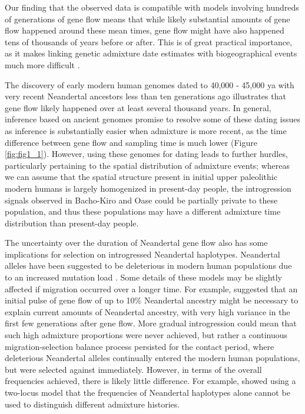 \documentclass[11pt]{article}
\begin{document}
Our finding that the observed data is compatible with models involving hundreds of generations of gene flow means that while likely substantial amounts of gene flow happened around these mean times, gene flow might have also happened tens of thousands of years before or after. This is of great practical importance, as it makes linking genetic admixture date estimates with biogeographical events much more difficult \citep{sankararaman_date_2012,lazaridis_genomic_2016,douka_age_2019,jacobs_multiple_2019,vyas_analyses_2019}. 

The discovery of early modern human genomes dated to 40,000 - 45,000 ya with very recent Neandertal ancestors less than ten generations ago \citep{fu_genome_2014, hajdinjak_initial_2021} illustrates that gene flow likely happened over at least several thousand years.  In general, inference based on ancient genomes \citep{fu_genome_2014, fu_early_2015, moorjani_genetic_2016, hajdinjak_initial_2021} promise to resolve some of these dating issues as inference is substantially easier when admixture is more recent, as the time difference between gene flow and sampling time is much lower (Figure \ref{fig:fig1_1}). However, using these genomes for dating leads to further hurdles, particularly pertaining to the spatial distribution of admixture events; whereas we can assume that the spatial structure present in initial upper paleolithic modern humans is largely homogenized in present-day people, the introgression signals observed in Bacho-Kiro and Oase could be partially private to these population, and thus these populations may have a different admixture time distribution than present-day people.

The uncertainty over the duration of Neandertal gene flow also has some implications for selection on introgressed Neandertal haplotypes. Neandertal alleles have been suggested to be deleterious in modern human populations due to an increased mutation load \citep{harris_genetic_2016, juric_strength_2016}. Some details of these models may be slightly affected if migration occurred over a longer time. For example, \cite{harris_genetic_2016} suggested that an initial pulse of gene flow of up to 10\% Neandertal ancestry might be necessary to explain current amounts of Neandertal ancestry, with very high variance in the first few generations after gene flow. More gradual introgression could mean that such high admixture proportions were never achieved, but rather a continuous migration-selection balance process persisted for the contact period, where deleterious Neandertal alleles continually entered the modern human populations, but were selected against immediately. 
However, in terms of the overall frequencies achieved, there is likely little difference. For example, \cite{juric_strength_2016} showed using a two-locus model that the frequencies of Neandertal haplotypes alone cannot be used to distinguish different admixture histories.
\end{document}
